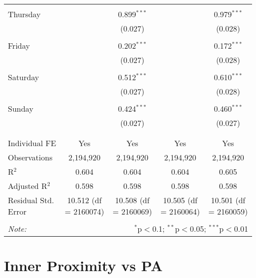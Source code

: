 \documentclass[
]{article}
\begin{document}
\begin{table}[!htbp]
{\begin{tabular}{@{\extracolsep{5pt}}lcccc}
  & & & & \\ 
 Thursday &  & 0.899$^{***}$ &  & 0.979$^{***}$ \\ 
  &  & (0.027) &  & (0.028) \\ 
  & & & & \\ 
 Friday &  & 0.202$^{***}$ &  & 0.172$^{***}$ \\ 
  &  & (0.027) &  & (0.028) \\ 
  & & & & \\ 
 Saturday &  & 0.512$^{***}$ &  & 0.610$^{***}$ \\ 
  &  & (0.027) &  & (0.028) \\ 
  & & & & \\ 
 Sunday &  & 0.424$^{***}$ &  & 0.460$^{***}$ \\ 
  &  & (0.027) &  & (0.027) \\ 
  & & & & \\ 
\hline \\[-1.8ex] 
Individual FE & Yes & Yes & Yes & Yes \\ 
Observations & 2,194,920 & 2,194,920 & 2,194,920 & 2,194,920 \\ 
R$^{2}$ & 0.604 & 0.604 & 0.604 & 0.605 \\ 
Adjusted R$^{2}$ & 0.598 & 0.598 & 0.598 & 0.598 \\ 
Residual Std. Error & 10.512 (df = 2160074) & 10.508 (df = 2160069) & 10.505 (df = 2160064) & 10.501 (df = 2160059) \\ 
\hline 
\hline \\[-1.8ex] 
\textit{Note:}  & \multicolumn{4}{r}{$^{*}$p$<$0.1; $^{**}$p$<$0.05; $^{***}$p$<$0.01} \\ 
\end{tabular}
} 
\end{table} 
\newpage
\section{Inner Proximity vs PA}
\end{document}
